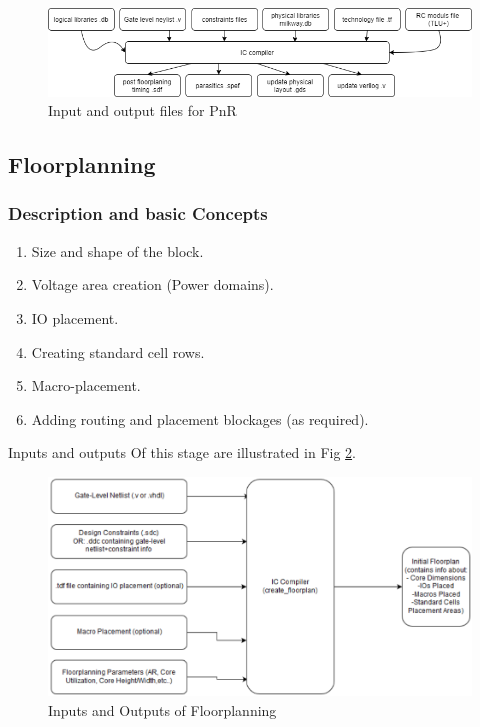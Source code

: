 \documentclass[../main.tex]{subfiles}
\begin{document}
\begin{figure}[h]
\centering
\includegraphics[width=15cm]{diagrams/IO_IC.png}
\caption{ Input and output files for PnR}
\label{fig:IO_IC}
\end{figure}
\subsection{Floorplanning} 
\subsubsection{Description and basic Concepts}
\begin{enumerate}
\item Size and shape of the block.
\item Voltage area creation (Power domains).
\item IO placement.
\item Creating standard cell rows.
\item Macro-placement.
\item Adding routing and placement blockages (as required).
\end{enumerate}

Inputs and outputs Of this stage are illustrated in Fig \ref{fig:IO_floorplaning}.

\begin{figure}[h]
\centering
\includegraphics[width=15cm]{diagrams/IO_floorplaning.PNG}
\caption{ Inputs and Outputs of Floorplanning}
\label{fig:IO_floorplaning}
\end{figure}
\end{document}
